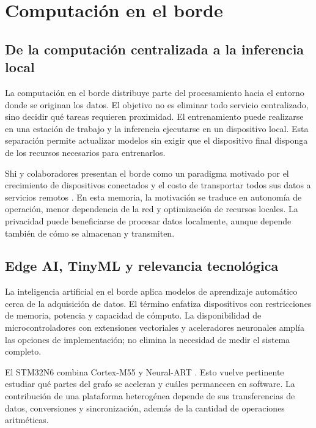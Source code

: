 \section{Computación en el borde}\label{sec:contexto_borde}
\subsection{De la computación centralizada a la inferencia local}
La computación en el borde distribuye parte del procesamiento hacia el entorno donde se originan los datos. El objetivo no es eliminar todo servicio centralizado, sino decidir qué tareas requieren proximidad. El entrenamiento puede realizarse en una estación de trabajo y la inferencia ejecutarse en un dispositivo local. Esta separación permite actualizar modelos sin exigir que el dispositivo final disponga de los recursos necesarios para entrenarlos.

Shi y colaboradores presentan el borde como un paradigma motivado por el crecimiento de dispositivos conectados y el costo de transportar todos sus datos a servicios remotos \cite{shi2016}. En esta memoria, la motivación se traduce en autonomía de operación, menor dependencia de la red y optimización de recursos locales. La privacidad puede beneficiarse de procesar datos localmente, aunque depende también de cómo se almacenan y transmiten.

\subsection{Edge AI, TinyML y relevancia tecnológica}
La inteligencia artificial en el borde aplica modelos de aprendizaje automático cerca de la adquisición de datos. El término  enfatiza dispositivos con restricciones de memoria, potencia y capacidad de cómputo. La disponibilidad de microcontroladores con extensiones vectoriales y aceleradores neuronales amplía las opciones de implementación; no elimina la necesidad de medir el sistema completo.

El STM32N6 combina Cortex-M55 y Neural-ART \cite{stm32n6}. Esto vuelve pertinente estudiar qué partes del grafo se aceleran y cuáles permanecen en software. La contribución de una plataforma heterogénea depende de sus transferencias de datos, conversiones y sincronización, además de la cantidad de operaciones aritméticas.

